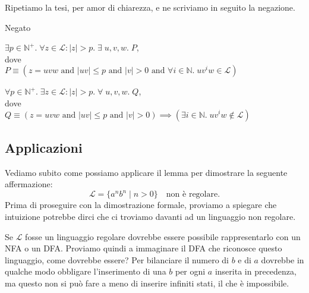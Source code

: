 \documentclass[class=book, crop=false, oneside, 12pt]{standalone}
\begin{document}
Ripetiamo la tesi, per amor di chiarezza, e ne scriviamo in seguito la negazione.
\begin{labeling}{Negato}
    \item[Tesi] 
    \(\exists p \in \mathbb{N}^+ . \;\forall z \in \mathcal{L}:|z|>p . \; \exists \;u, v, w . \; P\), \\ 
    dove \\
    \(P \equiv (z = uvw \textrm{ and } |uv| \le p \textrm{ and } |v| > 0 \textrm{ and } \forall i \in \mathbb{N} . \; uv^iw \in \mathcal{L}) \)
    \item[Negato]
    \(\forall p \in \mathbb{N}^+ . \;\exists z \in \mathcal{L}:|z|>p . \; \forall \;u, v, w . \; Q\), \\
    dove \\
    \(Q \equiv (z = uvw \textrm{ and } |uv| \le p \textrm{ and } |v| > 0) \implies (\exists i \in \mathbb{N} . \; uv^iw \notin \mathcal{L}) \) 
\end{labeling}

\subsection{Applicazioni}
Vediamo subito come possiamo applicare il lemma per dimostrare la seguente affermazione:
\begin{equation}
    \mathcal{L} = \{a^n b^n \mid n>0\} \quad \textrm{non è regolare.}
    \label{pl_regular_languages_ex_1}
\end{equation}
Prima di proseguire con la dimostrazione formale, proviamo a spiegare che intuizione potrebbe dirci che ci troviamo davanti ad un linguaggio non regolare.

Se \(\mathcal{L}\) fosse un linguaggio regolare dovrebbe essere possibile rappresentarlo con un NFA o un DFA. Proviamo quindi a immaginare il DFA che riconosce questo linguaggio, come dovrebbe essere? Per bilanciare il numero di \(b\) e di \(a\) dovrebbe in qualche modo obbligare l’inserimento di una \(b\) per ogni \(a\) inserita in precedenza, ma questo non si può fare a meno di inserire infiniti stati, il che è impossibile.
\end{document}
